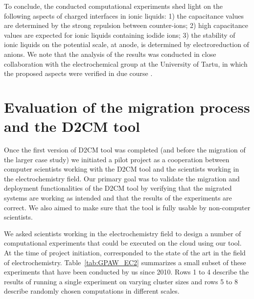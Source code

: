 \documentclass[a4paper,10pt]{article}
\begin{document}
To conclude, the conducted computational experiments shed light on the following aspects of charged interfaces in ionic liquids: 1) the capacitance values are determined by the strong repulsion between counter-ions; 2) high capacitance values are expected for ionic liquids containing iodide ions; 3) the stability of ionic liquids on the potential scale, at anode, is determined by electroreduction of anions. We note that the analysis of the results was conducted in close collaboration with the electrochemical group at the University of Tartu, in which the proposed aspects were verified in due course \cite{Siinor2013,Tonisoo2013}.

\section{Evaluation of the migration process and the D2CM tool}

Once the first version of D2CM tool was completed (and before the migration of the larger case study) we initiated a pilot project as a cooperation between computer scientists working with the D2CM tool and the scientists working in the electrochemistry field. Our primary goal was to validate the migration and deployment functionalities of the D2CM tool by verifying that the migrated systems are working as intended and that the results of the experiments are correct. We also aimed to make sure that the tool is fully usable by non-computer scientists. 

We asked scientists working in the electrochemistry field to design a number of computational experiments that could be executed on the cloud using our tool. At the time of project initiation, corresponded to the state of the art in the field of electrochemistry. Table~\ref{tab:GPAW_EC2} summarizes a small subset of these experiments that have been conducted by us since 2010. Rows 1 to 4 describe the results of running a single experiment on varying cluster sizes and rows 5 to 8 describe randomly chosen computations in different scales. 
\end{document}

